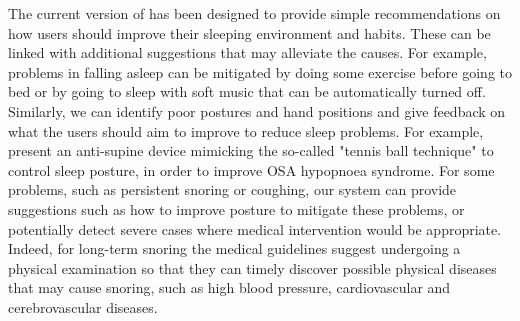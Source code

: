  The current version of {\systemname} has been designed to provide simple recommendations on how users should improve their sleeping environment and habits. These can be linked with additional suggestions that may alleviate the causes. For example, problems in falling asleep can be mitigated by doing some exercise before going to bed or by going to sleep with soft music that can be automatically turned off. Similarly, we can identify poor postures and hand positions and give feedback on what the users should aim to improve to reduce sleep problems. For example, \cite{posture} present an anti-supine device mimicking the so-called "tennis ball technique" to control sleep posture, in order to improve OSA hypopnoea syndrome. For some problems, such as persistent snoring or coughing, our system can provide suggestions such as how to improve posture to mitigate these problems, or potentially detect severe cases where medical intervention would be appropriate. Indeed, for long-term snoring the medical guidelines suggest undergoing a physical examination so that they can timely discover possible physical diseases that may cause snoring, such as high blood pressure, cardiovascular and cerebrovascular diseases.
